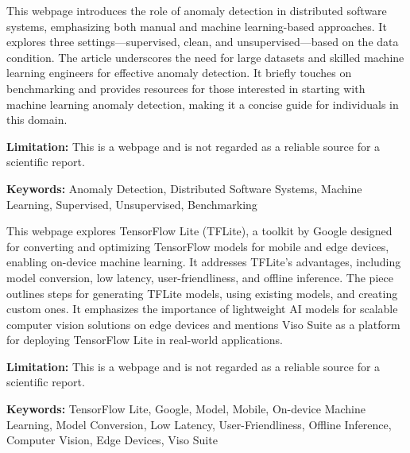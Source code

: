 { 
	
	This webpage \cite{Johnson:2023} introduces the role of anomaly detection in distributed software systems, emphasizing both manual and machine learning-based approaches. It explores three settings—supervised, clean, and unsupervised—based on the data condition. The article underscores the need for large datasets and skilled machine learning engineers for effective anomaly detection. It briefly touches on benchmarking and provides resources for those interested in starting with machine learning anomaly detection, making it a concise guide for individuals in this domain.
	
	\bigskip
	
	\textbf{Limitation:} This is a webpage and is not regarded as a reliable source for a scientific report.
	
	\scriptsize{\textbf{Keywords:} Anomaly Detection, Distributed Software Systems, Machine Learning, Supervised, Unsupervised, Benchmarking}
}


{ 
	This webpage \cite{Boesch:2021} explores TensorFlow Lite (TFLite), a toolkit by Google designed for converting and optimizing TensorFlow models for mobile and edge devices, enabling on-device machine learning. It addresses TFLite's advantages, including model conversion, low latency, user-friendliness, and offline inference. The piece outlines steps for generating TFLite models, using existing models, and creating custom ones. It emphasizes the importance of lightweight AI models for scalable computer vision solutions on edge devices and mentions Viso Suite as a platform for deploying TensorFlow Lite in real-world applications.
	
	\bigskip
	
	\textbf{Limitation:} This is a webpage and is not regarded as a reliable source for a scientific report.
	
	\scriptsize{\textbf{Keywords:} TensorFlow Lite, Google, Model, Mobile, On-device Machine Learning, Model Conversion, Low Latency, User-Friendliness, Offline Inference, Computer Vision, Edge Devices, Viso Suite}
}


